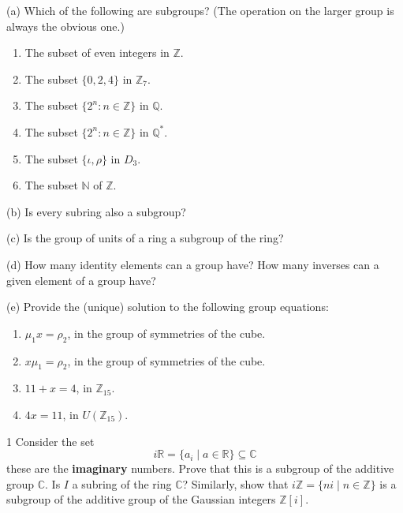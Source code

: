 \begin{problem}[Warmup]{(a)}
    Which of the following are subgroups? (The operation on the larger group is always the obvious one.)
    \begin{enumerate}
        \item[(a)] The subset of even integers in $\mathbb{Z}$.
        \item[(b)] The subset $\{0, 2, 4\}$ in $\mathbb{Z}_7$.
        \item[(c)] The subset $\{2^n : n \in \mathbb{Z}\}$ in $\mathbb{Q}$.
        \item[(d)] The subset $\{2^n : n \in \mathbb{Z}\}$ in $\mathbb{Q}^*$.
        \item[(e)] The subset $\{\iota, \rho\}$ in $D_3$.
        \item[(f)] The subset $\mathbb{N}$ of $\mathbb{Z}$.
    \end{enumerate}
\end{problem}
\unsolved

\begin{problem}[Warmup]{(b)}
    Is every subring also a subgroup?
\end{problem}
\unsolved

\begin{problem}[Warmup]{(c)}
    Is the group of units of a ring a subgroup of the ring?
\end{problem}
\unsolved

\begin{problem}[Warmup]{(d)}
    How many identity elements can a group have? How many inverses can a given element of a group have?
\end{problem}
\unsolved

\begin{problem}[Warmup]{(e)}
    Provide the (unique) solution to the following group equations:
    \begin{enumerate}
        \item[(a)] $\mu_1 x = \rho_2$, in the group of symmetries of the cube.
        \item[(b)] $x\mu_1 = \rho_2$, in the group of symmetries of the cube.
        \item[(c)] $11 + x = 4$, in $\mathbb{Z}_{15}$.
        \item[(d)] $4x = 11$, in $U(\mathbb{Z}_{15})$.
    \end{enumerate}
\end{problem}
\unsolved

\begin{problem}{1}
    Consider the set 
    \[i \mathbb{R} = \{a_i \mid a \in \mathbb{R}\} \subseteq \mathbb{C}\]
    these are the \textbf{imaginary} numbers.
    Prove that this is a subgroup of the additive group $\mathbb{C}$.
    Is $I$ a subring of the ring $\mathbb{C}$?
    Similarly, show that $i\mathbb{Z} = \{ni \mid n \in \mathbb{Z}\}$
        is a subgroup of the additive group of the Gaussian
        integers $\mathbb{Z}[i]$.
\end{problem}
\solved


